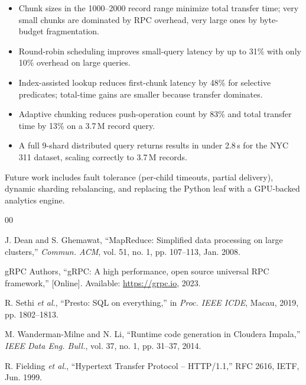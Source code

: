 \documentclass[conference]{IEEEtran}
\begin{document}
\begin{itemize}
  \item Chunk sizes in the 1000--2000 record range minimize total transfer time;
        very small chunks are dominated by RPC overhead, very large ones by
        byte-budget fragmentation.
  \item Round-robin scheduling improves small-query latency by up to 31\%
        with only 10\% overhead on large queries.
  \item Index-assisted lookup reduces first-chunk latency by 48\% for selective
        predicates; total-time gains are smaller because transfer dominates.
  \item Adaptive chunking reduces push-operation count by 83\% and total
        transfer time by 13\% on a 3.7\,M record query.
  \item A full 9-shard distributed query returns results in under 2.8\,s for
        the NYC 311 dataset, scaling correctly to 3.7\,M records.
\end{itemize}

Future work includes fault tolerance (per-child timeouts, partial delivery),
dynamic sharding rebalancing, and replacing the Python leaf with a GPU-backed
analytics engine.

\begin{thebibliography}{00}

J. Dean and S. Ghemawat,
``MapReduce: Simplified data processing on large clusters,''
\textit{Commun. ACM}, vol. 51, no. 1, pp. 107--113, Jan. 2008.

gRPC Authors,
``gRPC: A high performance, open source universal RPC framework,''
[Online]. Available: \url{https://grpc.io}, 2023.

R. Sethi \textit{et al.},
``Presto: SQL on everything,''
in \textit{Proc. IEEE ICDE}, Macau, 2019, pp. 1802--1813.

M. Wanderman-Milne and N. Li,
``Runtime code generation in Cloudera Impala,''
\textit{IEEE Data Eng. Bull.}, vol. 37, no. 1, pp. 31--37, 2014.

R. Fielding \textit{et al.},
``Hypertext Transfer Protocol -- HTTP/1.1,''
RFC 2616, IETF, Jun. 1999.

\end{thebibliography}
\end{document}
